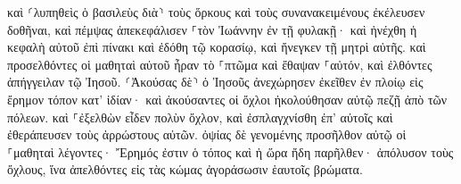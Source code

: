 \documentclass{openreader}
\begin{document}
καὶ ⸂λυπηθεὶς ὁ βασιλεὺς διὰ⸃ τοὺς ὅρκους καὶ τοὺς συνανακειμένους ἐκέλευσεν δοθῆναι, 
καὶ πέμψας ἀπεκεφάλισεν ⸀τὸν Ἰωάννην ἐν τῇ φυλακῇ· 
καὶ ἠνέχθη ἡ κεφαλὴ αὐτοῦ ἐπὶ πίνακι καὶ ἐδόθη τῷ κορασίῳ, καὶ ἤνεγκεν τῇ μητρὶ αὐτῆς. 
καὶ προσελθόντες οἱ μαθηταὶ αὐτοῦ ἦραν τὸ ⸀πτῶμα καὶ ἔθαψαν ⸀αὐτόν, καὶ ἐλθόντες ἀπήγγειλαν τῷ Ἰησοῦ. 
⸂Ἀκούσας δὲ⸃ ὁ Ἰησοῦς ἀνεχώρησεν ἐκεῖθεν ἐν πλοίῳ εἰς ἔρημον τόπον κατ’ ἰδίαν· καὶ ἀκούσαντες οἱ ὄχλοι ἠκολούθησαν αὐτῷ πεζῇ ἀπὸ τῶν πόλεων. 
καὶ ⸀ἐξελθὼν εἶδεν πολὺν ὄχλον, καὶ ἐσπλαγχνίσθη ἐπ’ αὐτοῖς καὶ ἐθεράπευσεν τοὺς ἀρρώστους αὐτῶν. 
ὀψίας δὲ γενομένης προσῆλθον αὐτῷ οἱ ⸀μαθηταὶ λέγοντες· Ἔρημός ἐστιν ὁ τόπος καὶ ἡ ὥρα ἤδη παρῆλθεν· ἀπόλυσον τοὺς ὄχλους, ἵνα ἀπελθόντες εἰς τὰς κώμας ἀγοράσωσιν ἑαυτοῖς βρώματα. 
\end{document}
